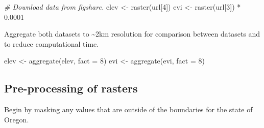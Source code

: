\documentclass[
]{article}
\newenvironment{Shaded}{\begin{snugshade}}{\end{snugshade}}
\newcommand{\AttributeTok}[1]{\textcolor[rgb]{0.77,0.63,0.00}{#1}}
\newcommand{\CommentTok}[1]{\textcolor[rgb]{0.56,0.35,0.01}{\textit{#1}}}
\newcommand{\ConstantTok}[1]{\textcolor[rgb]{0.00,0.00,0.00}{#1}}
\newcommand{\DecValTok}[1]{\textcolor[rgb]{0.00,0.00,0.81}{#1}}
\newcommand{\FloatTok}[1]{\textcolor[rgb]{0.00,0.00,0.81}{#1}}
\newcommand{\FunctionTok}[1]{\textcolor[rgb]{0.00,0.00,0.00}{#1}}
\newcommand{\NormalTok}[1]{#1}
\newcommand{\OtherTok}[1]{\textcolor[rgb]{0.56,0.35,0.01}{#1}}
\newcommand{\SpecialCharTok}[1]{\textcolor[rgb]{0.00,0.00,0.00}{#1}}
\newcommand{\StringTok}[1]{\textcolor[rgb]{0.31,0.60,0.02}{#1}}
\begin{document}
\begin{Shaded}
\begin{Highlighting}[]
\CommentTok{\# Download data from figshare. }
\NormalTok{elev }\OtherTok{\textless{}{-}} \FunctionTok{raster}\NormalTok{(url[}\DecValTok{4}\NormalTok{])}
\NormalTok{evi }\OtherTok{\textless{}{-}} \FunctionTok{raster}\NormalTok{(url[}\DecValTok{3}\NormalTok{]) }\SpecialCharTok{*} \FloatTok{0.0001}
\end{Highlighting}
\end{Shaded}

Aggregate both datasets to \textasciitilde2km resolution for comparison
between datasets and to reduce computational time.

\begin{Shaded}
\begin{Highlighting}[]
\NormalTok{elev }\OtherTok{\textless{}{-}} \FunctionTok{aggregate}\NormalTok{(elev, }\AttributeTok{fact =} \DecValTok{8}\NormalTok{)}
\NormalTok{evi }\OtherTok{\textless{}{-}} \FunctionTok{aggregate}\NormalTok{(evi, }\AttributeTok{fact =} \DecValTok{8}\NormalTok{)}
\end{Highlighting}
\end{Shaded}

\hypertarget{pre-processing-of-rasters}{%
\subsection{Pre-processing of rasters}\label{pre-processing-of-rasters}}

Begin by masking any values that are outside of the boundaries for the
state of Oregon.

\begin{Shaded}
\end{Shaded}
\end{document}

